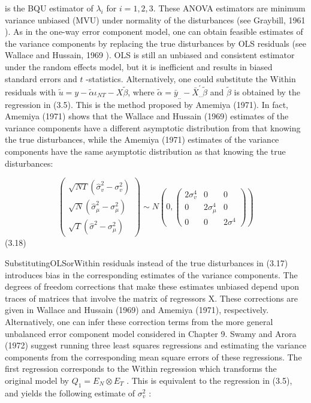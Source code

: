 \documentclass[
]{book}
\begin{document}
is the BQU estimator of \(\lambda_{i}\) for \(i=1,2,3\). These ANOVA estimators are minimum variance unbiased (MVU) under normality of the disturbances (see Graybill, 1961 ). As in the one-way error component model, one can obtain feasible estimates of the variance components by replacing the true disturbances by OLS residuals (see Wallace and Hussain, 1969 ). OLS is still an unbiased and consistent estimator under the random effects model, but it is inefficient and results in biased standard errors and \(t\) -statistics. Alternatively, one could substitute the Within residuals with \(\tilde{u}=y-\widetilde{\alpha} \iota_{N T}-X \widetilde{\beta}\), where \(\tilde{\alpha}=\bar{y}_{. .}-\bar{X}_{. .}^{\prime} \tilde{\beta}\) and \(\widetilde{\beta}\) is obtained by the regression
in (3.5). This is the method proposed by Amemiya (1971). In fact, Amemiya (1971) shows that the Wallace and Hussain (1969) estimates of the variance components have a different asymptotic distribution from that knowing the true disturbances, while the Amemiya (1971) estimates of the variance components have the same asymptotic distribution as that knowing the true disturbances:

\begin{equation}
\left(\begin{array}{c}
\sqrt{N T}\left(\widehat{\sigma}_{v}^{2}-\sigma_{v}^{2}\right) \\
\sqrt{N}\left(\widehat{\sigma}_{\mu}^{2}-\sigma_{\mu}^{2}\right) \\
\sqrt{T}\left(\widehat{\sigma}^{2}-\sigma_{\mu}^{2}\right)
\end{array}\right) \sim N\left(0,\left(\begin{array}{ccc}
2 \sigma_{v}^{4} & 0 & 0 \\
0 & 2 \sigma_{\mu}^{4} & 0 \\
0 & 0 & 2 \sigma^{4}
\end{array}\right)\right)
\end{equation} (3.18)

SubstitutingOLSorWithin residuals instead of the true disturbances in (3.17) introduces bias in
the corresponding estimates of the variance components. The degrees of freedom corrections
that make these estimates unbiased depend upon traces of matrices that involve the matrix
of regressors X. These corrections are given in Wallace and Hussain (1969) and Amemiya
(1971), respectively. Alternatively, one can infer these correction terms from the more general
unbalanced error component model considered in Chapter 9.
Swamy and Arora (1972) suggest running three least squares regressions and estimating
the variance components from the corresponding mean square errors of these regressions. The
first regression corresponds to the Within regression which transforms the original model by
\(Q_1=E_N \otimes E_T\) . This is equivalent to the regression in (3.5), and yields the following estimate
of \(\sigma_v^2\) :
\end{document}
